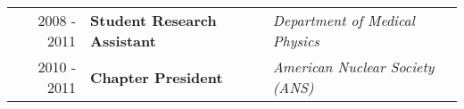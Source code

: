 \begin{minipage}{\textwidth}
\begin{itemize}
	\end{itemize}
\end{minipage}


\begin{minipage}{\textwidth}
		\begin{tabular}{rll}
			2008 - 2011 & \textbf{Student Research Assistant} & \textit{Department of Medical Physics} \\
			2010 - 2011 & \textbf{Chapter President} & \textit{American Nuclear Society (ANS)} \\
		\end{tabular}
\end{minipage}

